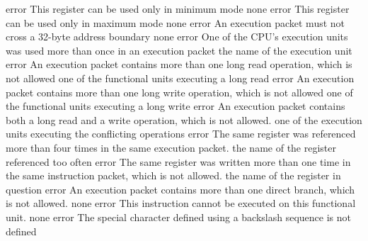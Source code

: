 \documentclass[12pt,twoside]{report}
\begin{document}
\begin{description}
               {error}
               {This register can be used only in minimum mode}
               {none}
               {error}
               {This register can be used only in maximum mode}
               {none}
               {error}
               {An execution packet must not cross a 32-byte address
                boundary}
               {none}
               {error}
               {One of the CPU's execution units was used more than
                once in an execution packet}
               {the name of the execution unit}
               {error}
               {An execution packet contains more than one long read
                operation, which is not allowed}
               {one of the functional units executing a long read}
               {error}
               {An execution packet contains more than one long write
                operation, which is not allowed}
               {one of the functional units executing a long write}
               {error}
               {An execution packet contains both a long read and a write
                operation, which is not allowed.}
               {one of the execution units executing the conflicting
                operations}
               {error}
               {The same register was referenced more than four times in
                the same execution packet.}
               {the name of the register referenced too often}
               {error}
               {The same register was written more than one time in the
                same instruction packet, which is not allowed.}
               {the name of the register in question}
               {error}
               {An execution packet contains more than one direct branch,
                which is not allowed.}
               {none}
               {error}
               {This instruction cannot be executed on this functional
                unit.}
               {none}
               {error}
               {The special character defined using a backslash sequence
                is not defined}

\end{description}
\end{document}
